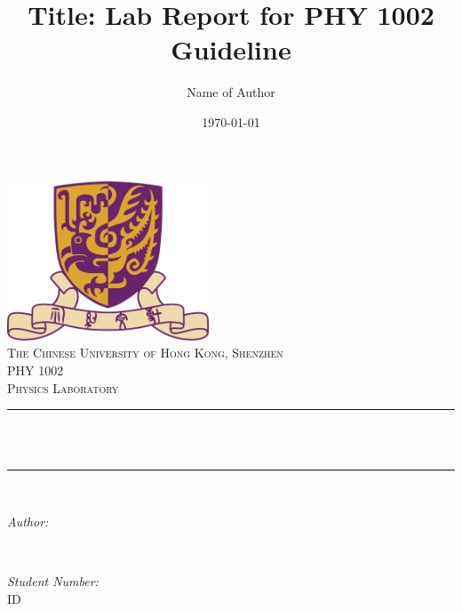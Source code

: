 \title{Title: Lab Report for PHY 1002 Guideline} %
\author{Name of Author}%
\date{\today}%




\begin{titlepage}
    \centering
    \vspace*{0.5 cm}
    \includegraphics[scale = 0.75,width=6cm]{CUHK}\\[1.0 cm]   %
    \textsc{\large The Chinese University of Hong Kong, Shenzhen}\\[2.0 cm] 
    \textsc{\Large PHY 1002}\\[0.5 cm] 
    \textsc{\large Physics Laboratory}\\[0.5 cm]               %
    \rule{\linewidth}{0.2 mm} \\[0.4 cm]
    { \huge \bfseries \thetitle}\\
    \rule{\linewidth}{0.2 mm} \\[1.5 cm]
    
    \begin{minipage}{0.4\textwidth}
        \begin{flushleft} \large
            \emph{Author:}\\
            \theauthor
            \end{flushleft}
    \end{minipage}~
    \begin{minipage}{0.4\textwidth}
            \begin{flushright} \large
            \emph{Student Number:} \\
            ID  %
        \end{flushright}
    \end{minipage}\\[2 cm]
    {\large \thedate}\\[2 cm]
 
    \vfill
    
\end{titlepage}

